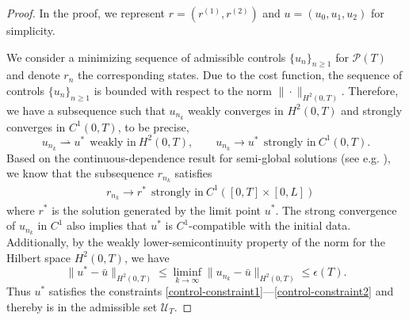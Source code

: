 \documentclass[12pt]{article}
\numberwithin{equation}{section}
\begin{document}


\begin{proof}
In the proof, we represent $r=(r^{(1)},r^{(2)})$ and $u=(u_0,u_1,u_2)$ for simplicity. 

We consider a minimizing sequence of admissible controls $\{u_{n}\}_{n\geq 1}$ for $\mathcal{P}(T)$ and denote $r_n$ the corresponding states. Due to the cost function, the sequence of controls $\{u_{n}\}_{n\geq 1}$ is bounded with respect to the norm $\|\cdot\|_{H^2(0,T)}$. 
Therefore, we have a subsequence such that $u_{n_k}$ weakly converges in $H^2(0,T)$ and strongly converges in $C^1(0,T)$, to be precise, 
$$
u_{n_k} \rightharpoonup u^{*} ~~\text{weakly in}~H^2(0,T),\qquad 
u_{n_k} \rightarrow u^{*} ~~\text{strongly in}~C^1(0,T).
$$
Based on the continuous-dependence result for semi-global solutions (see e.g. \cite{wang2006exact}), we know that the subsequence $r_{n_k}$ satisfies 
\begin{align*}
&r_{n_k} \rightarrow r^{*} ~~\text{strongly in}~C^1([0,T]\times [0,L])
\end{align*}
where $r^{*}$ is the solution generated by the limit point $u^*$. The strong convergence of $u_{n_k}$ in $C^1$ also implies that $u^*$ is $C^1$-compatible with the initial data. Additionally, by the weakly lower-semicontinuity property of the norm for the Hilbert space $H^2(0,T)$, we have
\begin{equation}\label{proof-ex-eq1}
\|u^*-\bar{u}\|_{H^2(0,T)} \leq  \liminf_{k\rightarrow \infty} \|u_{n_k}-\bar{u}\|_{H^2(0,T)}\leq \epsilon(T).
\end{equation}
Thus $u^*$ satisfies the constraints \eqref{control-constraint1}---\eqref{control-constraint2} and thereby is in the admissible set $\mathcal{U}_T$. 


\end{proof}
\end{document}
